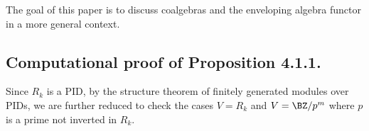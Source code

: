 The goal of this paper is to discuss coalgebras and the enveloping algebra functor in a more general context. 



\subsection{Computational proof of Proposition 4.1.1.}

Since $R_k$ is a PID, by the structure theorem of finitely generated modules over PIDs, we are further reduced to check the cases $V=R_k$ and $V=\BZ/p^m$ where $p$ is a prime not inverted in $R_k$. 

